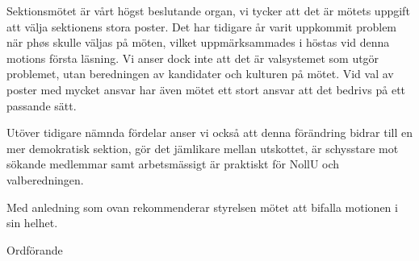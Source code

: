 \documentclass[../_main/handlingar.tex]{subfiles}
\begin{document}
\motionssvar

Sektionsmötet är vårt högst beslutande organ, vi tycker att det är mötets uppgift att välja sektionens stora poster. Det har tidigare år varit uppkommit problem när phøs skulle väljas på möten, vilket uppmärksammades i höstas vid denna motions första läsning. Vi anser dock inte att det är valsystemet som utgör problemet, utan beredningen av kandidater och kulturen på mötet. Vid val av poster med mycket ansvar har även mötet ett stort ansvar att det bedrivs på ett passande sätt. 

Utöver tidigare nämnda fördelar anser vi också att denna förändring bidrar till en mer demokratisk sektion, gör det jämlikare mellan utskottet, är schysstare mot sökande medlemmar samt arbetsmässigt är praktiskt för NollU och valberedningen. 

Med anledning som ovan rekommenderar styrelsen mötet att bifalla motionen i sin helhet. 

\begin{signatures}{1}
    \ist
    \signature{\ordf}{Ordförande}
\end{signatures}
\end{document}
